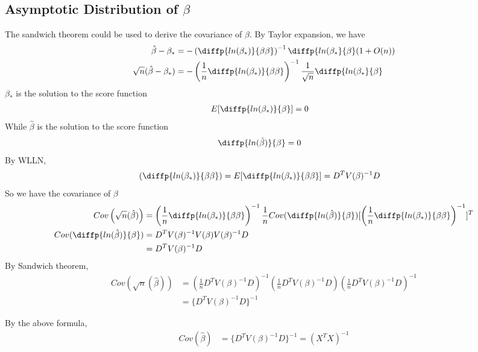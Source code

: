 \documentclass[11pt]{article} %
\begin{document}
\subsection{Asymptotic Distribution of $\beta$}
The sandwich theorem could be used to derive the covariance of $\beta$. By Taylor expansion, we have 
\begin{align*}
	\hat{\beta} - \beta_{\ast} &= - \left( \diffp{ln(\beta_{\ast})}{\beta \beta} \right)^{-1} \diffp{ln(\beta_{\ast}}{\beta} (1+O(n)) \\
	\sqrt{n} (\hat{\beta} - \beta_{\ast}) &= - \left(\frac{1}{n} \diffp{ln(\beta_{\ast})}{\beta \beta} \right)^{-1} \frac{1}{\sqrt{n}} \diffp{ln(\beta_{\ast}}{\beta} 
\end{align*}
$\beta_{\ast}$ is the solution to the score function
\begin{align*}
	E[\diffp{ln(\beta_{\ast})}{\beta}] &= 0
\end{align*}
While $\hat{\beta}$ is the solution to the score function
\begin{align*}
	\diffp{ln(\hat{\beta})}{\beta} &= 0
\end{align*}
By WLLN,
\begin{align*}
 \left( \diffp{ln({\beta}_{\ast})}{\beta \beta} \right) & =   E[ \diffp{ln({\beta_{\ast}})}{\beta \beta}] = D^T V(\beta)^{-1} D
\end{align*}
So we have the covariance of $\beta$
\begin{align*}
	Cov \left(\sqrt{n} (\hat{\beta})\right) &= \left(\frac{1}{n} \diffp{ln(\beta_{\ast})}{\beta \beta} \right)^{-1} \frac{1}{n} Cov(\diffp{ln(\hat{\beta})}{\beta})  [\left(\frac{1}{n} \diffp{ln(\beta_{\ast})}{\beta \beta} \right)^{-1}]^T\\
	Cov(\diffp{ln(\hat{\beta})}{\beta})	&= D^T V(\beta)^{-1} V(\beta) V(\beta)^{-1} D\\
	&= D^T V(\beta)^{-1} D
\end{align*}
By Sandwich theorem,
\begin{align*}
	Cov \left(\sqrt{n} (\hat{\beta})\right) &= \left(\frac{1}{n} D^T V(\beta)^{-1} D \right)^{-1} \left(\frac{1}{n} D^T V(\beta)^{-1}  D\right) \left(\frac{1}{n} D^T V(\beta)^{-1} D  \right)^{-1}\\
	&= \{D^T V(\beta)^{-1} D\}^{-1}
\end{align*}

By the above formula, 
\begin{align*}
	Cov (\hat{\beta}) &= \{D^T V(\beta)^{-1} D\}^{-1} = (X^T X)^{-1}
\end{align*}
\end{document}
